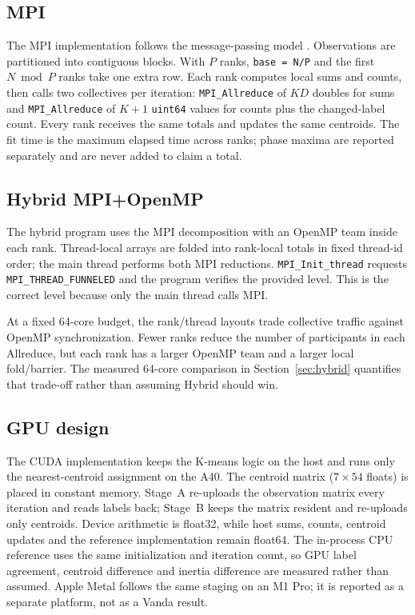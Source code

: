 \documentclass[10pt,a4paper]{article}
\newcommand{\code}[1]{\texttt{#1}}
\begin{document}
\subsection{MPI}
The MPI implementation follows the message-passing model \citep{mpiforum2015}. Observations are partitioned into contiguous blocks. With $P$ ranks,
\code{base = N/P} and the first $N\bmod P$ ranks take one extra row. Each rank
computes local sums and counts, then calls two collectives per iteration:
\code{MPI\_Allreduce} of $K D$ doubles for sums and \code{MPI\_Allreduce} of
$K+1$ \code{uint64} values for counts plus the changed-label count. Every rank
receives the same totals and updates the same centroids. The fit time is the
maximum elapsed time across ranks; phase maxima are reported separately and are
never added to claim a total.

\subsection{Hybrid MPI+OpenMP}
The hybrid program uses the MPI decomposition with an OpenMP team inside each
rank. Thread-local arrays are folded into rank-local totals in fixed thread-id
order; the main thread performs both MPI reductions. \code{MPI\_Init\_thread}
requests \code{MPI\_THREAD\_FUNNELED} and the program verifies the provided
level. This is the correct level because only the main thread calls MPI.

At a fixed 64-core budget, the rank/thread layouts trade collective traffic
against OpenMP synchronization. Fewer ranks reduce the number of participants
in each Allreduce, but each rank has a larger OpenMP team and a larger local
fold/barrier. The measured 64-core comparison in Section~\ref{sec:hybrid}
quantifies that trade-off rather than assuming Hybrid should win.

\subsection{GPU design}
The CUDA \citep{nickolls2008} implementation keeps the K-means logic on the host and runs only the
nearest-centroid assignment on the A40. The centroid matrix ($7\times54$
floats) is placed in constant memory. Stage~A re-uploads the observation matrix
every iteration and reads labels back; Stage~B keeps the matrix resident and
re-uploads only centroids. Device arithmetic is float32, while host sums,
counts, centroid updates and the reference implementation remain float64. The
in-process CPU reference uses the same initialization and iteration count, so
GPU label agreement, centroid difference and inertia difference are measured
rather than assumed. Apple Metal follows the same staging on an M1 Pro; it is
reported as a separate platform, not as a Vanda result.
\end{document}
